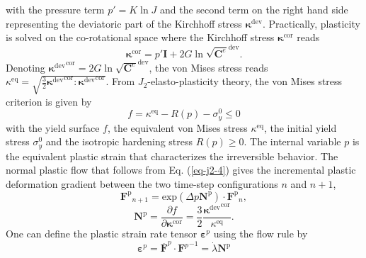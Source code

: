 with the pressure term $ p'= K\ln J$ and the second term on the right hand side representing the deviatoric part of the Kirchhoff stress $ \boldsymbol\kappa^\text{dev} $. Practically, plasticity is solved on the co-rotational space where the Kirchhoff stress $ \bm\kappa^\text{cor} $ reads
\begin{equation}\label{eq-j2-2-1}
\bm\kappa^\text{cor}=p'\textbf{I}+2G\ln\sqrt{\textbf{C}^e}^\text{dev}.
\end{equation}
Denoting $ {\bm\kappa^\text{dev}}^\text{cor}=2G\ln\sqrt{\textbf{C}^e}^\text{dev} $, the von Mises stress reads $ \kappa^\text{eq}=\sqrt{\frac{3}{2}{\bm\kappa^\text{dev}}^\text{cor}:{\bm\kappa^\text{dev}}^\text{cor}} $. 
From $ J_2 $-elasto-plasticity theory\cite{borjaPlasticityModelingComputation2013}, the von Mises stress criterion is given by
\begin{equation}\label{eq-j2-4}
f=\kappa^{\text{eq}}-R(p)-\sigma^0_y\le0
\end{equation}
with the yield surface $ f $, the equivalent von Mises stress $ \kappa^\text{eq} $, the initial yield stress $ \sigma^0_y $ and the isotropic hardening stress $ R(p)\ge0 $. The internal variable $ p $ is the equivalent plastic strain that characterizes the irreversible behavior. The normal plastic flow that follows from Eq. (\ref{eq-j2-4}) gives the incremental plastic deformation gradient between the two time-step configurations $ n $ and $ n+1 $,
\begin{equation}\label{eq-j2-4-5}
{\textbf{F}^{\text{p}}}_{n+1}=\text{exp}(\Delta p\mathbf{N}^{\text{p}})\cdot{\textbf{F}^{\text{p}}}_n,
\end{equation}
\begin{equation}\label{eq-j2-4-6}
\mathbf{N}^{\text{p}}=\frac{\partial f}{\partial \bm{\kappa}^\text{cor}}=\frac{3}{2}\frac{{\bm{\kappa}^\text{dev}}^\text{cor}}{\kappa^\text{eq}}.
\end{equation}
One can define the plastic strain rate tensor $ \bm\varepsilon^p $ using the flow rule by
\begin{equation}\label{eq-j2-4-2}
\bm\varepsilon^p=\overset{.}{ \textbf{F}}^p\cdot{\textbf{F}^p}^{-1}=\dot\lambda\mathbf{N}^{\text{p}}
\end{equation}
